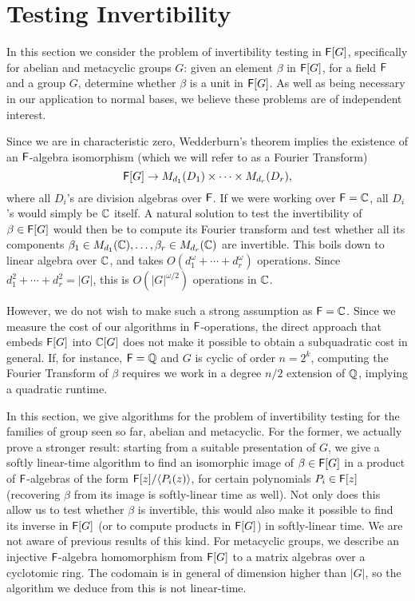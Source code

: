 \section{Testing Invertibility}
\label{sec:invertibility}

In this section we consider the problem of invertibility testing in
${\mathsf{F}}[G]$, specifically for abelian and metacyclic groups $G$: given an
element $\beta$ in ${\mathsf{F}}[G]$, for a field ${\mathsf{F}}$ and a group $G$, determine
whether $\beta$ is a unit in ${\mathsf{F}}[G]$.  As well as being necessary in our
application to normal bases, we believe these problems are of independent
interest.

Since we are in characteristic zero, Wedderburn's theorem implies the
existence of an ${\mathsf{F}}$-algebra isomorphism (which we will refer to as a
Fourier Transform)
\[
  {\mathsf{F}}[G] \to M_{d_1}(D_1) \times \dots \times M_{d_r}(D_r),
\]
where all $D_i$'s are division algebras over ${\mathsf{F}}$. If we were working over
${\mathsf{F}}=\mathbb{C}$, all $D_i$'s would simply be $\mathbb{C}$ itself.  A natural solution
to test the invertibility of $\beta \in {\mathsf{F}}[G]$ would then be to compute its
Fourier transform and test whether all its components
$\beta_1 \in M_{d_1}(\mathbb{C}),\dots,\beta_r \in M_{d_r}(\mathbb{C})$ are
invertible. This boils down to linear algebra over $\mathbb{C}$, and takes
$O(d_1^\omega + \cdots + d_r^\omega)$ operations.  Since
$d_1^2 + \cdots + d_r^2 = |G|$, this is $O(|G|^{\omega/2})$ operations in
$\mathbb{C}$.

However, we do not wish to make such a strong assumption as ${\mathsf{F}}=\mathbb{C}$. Since
we measure the cost of our algorithms in ${\mathsf{F}}$-operations, the direct
approach that embeds ${\mathsf{F}}[G]$ into $\mathbb{C}[G]$ does not make it possible to
obtain a subquadratic cost in general. If, for instance, ${\mathsf{F}}=\mathbb{Q}$ and $G$ is
cyclic of order $n=2^k$, computing the Fourier Transform of $\beta$
requires we work in a degree $n/2$ extension of $\mathbb{Q}$, implying a quadratic
runtime.

In this section, we give algorithms for the problem of invertibility
testing for the families of group seen so far, abelian and metacyclic. For
the former, we actually prove a stronger result: starting from a suitable
presentation of $G$, we give a softly linear-time algorithm to find an
isomorphic image of $\beta \in {\mathsf{F}}[G]$ in a product of ${\mathsf{F}}$-algebras of the
form ${\mathsf{F}}[z]/\langle P_i(z)\rangle$, for certain polynomials $P_i \in {\mathsf{F}}[z]$
(recovering $\beta$ from its image is softly-linear time as well). Not only
does this allow us to test whether $\beta$ is invertible, this would also
make it possible to find its inverse in ${\mathsf{F}}[G]$ (or to compute products in
${\mathsf{F}}[G]$) in softly-linear time.  We are not aware of previous results of
this kind. For metacyclic groups, we describe an injective ${\mathsf{F}}$-algebra
homomorphism from ${\mathsf{F}}[G]$ to a matrix algebras over a cyclotomic ring. The
codomain is in general of dimension higher than $|G|$, so the algorithm we
deduce from this is not linear-time.

